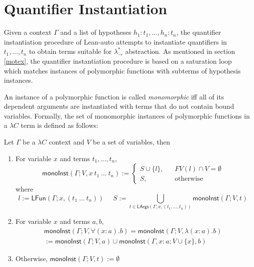 \section{Quantifier Instantiation}
Given a context $\Gamma$ and a list of hypotheses $h_1 : t_1, \dots, h_n : t_n$, the quantifier
instantiation procedure of Lean-auto attempts to instantiate quantifiers in
$t_1, \dots, t_n$ to obtain terms suitable for $\lambda_\to^*$ abstraction.
As mentioned in section \ref{motex}, the quantifier instantiation procedure
is based on a saturation loop which matches instances of polymorphic functions
with subterms of hypothesis instances.

\noindent An instance of a polymorphic function is called \textit{monomorphic} iff all
of its dependent arguments are instantiated with terms that do not contain bound
variables. Formally, the set of monomorphic instances of polymorphic functions in a
$\lambda C$ term is defined as follows:

\begin{definition}
  Let $\Gamma$ be a $\lambda C$ context and $V$ be a set of variables, then
  \begin{enumerate}
    \item For variable $x$ and terms $t_1, \dots, t_n$,
      $$\mathsf{monoInst}(\Gamma; V, x \ t_1 \ \dots \ t_n) := \left\{
        \begin{aligned}
          S \cup \{l\}, & & FV(l) \cap V = \emptyset \\
          S, & & \text{otherwise}
        \end{aligned}
      \right.$$
      where
      $$l := \mathsf{LFun}(\Gamma; x, (t_1 \ \dots \ t_n)) \ \ \ \ \ \ S := \bigcup_{t \in \mathsf{LArgs}(\Gamma; x, (t_1, \dots, t_n))} \mathsf{monoInst}(\Gamma; V, t)$$
    \item For variable $x$ and terms $a, b$,
      \begin{align*}
        \mathsf{monoInst}(\Gamma; V, \forall (x : a). b) = \mathsf{monoInst}(\Gamma; V, \lambda (x : a). b) 
        \\ := \mathsf{monoInst}(\Gamma; V, a) \cup \mathsf{monoInst}(\Gamma, x : a; V \cup \{x\}, b)
      \end{align*}
    \item Otherwise, $\mathsf{monoInst}(\Gamma; V, t) := \emptyset$
  \end{enumerate}
\end{definition}

